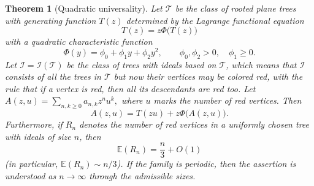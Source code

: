 \documentclass[10pt,a4paper]{amsart}
\newtheorem{theorem}{Theorem}[section]
\theoremstyle{remark}
\begin{document}
\begin{theorem}[Quadratic universality]\label{thm:quadratic-universality}
Let $\mathcal T$ be the class of rooted plane trees with
generating function \(T(z)\) determined by the Lagrange functional equation
\begin{equation} \label{charac}
T(z)=z\Phi\big(T(z)\big)
\end{equation}
with a quadratic characteristic function
\[
\Phi(y)=\phi_0+\phi_1y+\phi_2y^2,
\qquad
\phi_0,\phi_2>0,\quad \phi_1\geq 0.
\]
Let $\mathcal I = \mathcal I(\mathcal T)$ be the class of trees with ideals based on $\mathcal T$, which means that $\mathcal I$ consists of all the trees in $\mathcal T$
but now their vertices may be colored red, with the rule that if a vertex is red, then all its descendants are red too. Let
$
A(z,u)=\sum_{n,k\geq 0} a_{n,k}z^n u^k,
$
where \(u\) marks the number of red vertices. Then
\begin{equation} \label{defining}
A(z,u)=T(zu)+z\Phi\big(A(z,u)\big).
\end{equation}
Furthermore, if \(R_n\) denotes the number of red vertices in a uniformly chosen
tree with ideals of size \(n\), then
\[
\mathbb{E}(R_n)=\frac{n}{3}+O(1)
\]
(in particular, $\mathbb{E}(R_n)\sim n/3$).
If the family is periodic, then the assertion is understood as
\(n\to\infty\) through the admissible sizes.
\end{theorem}
\end{document}
